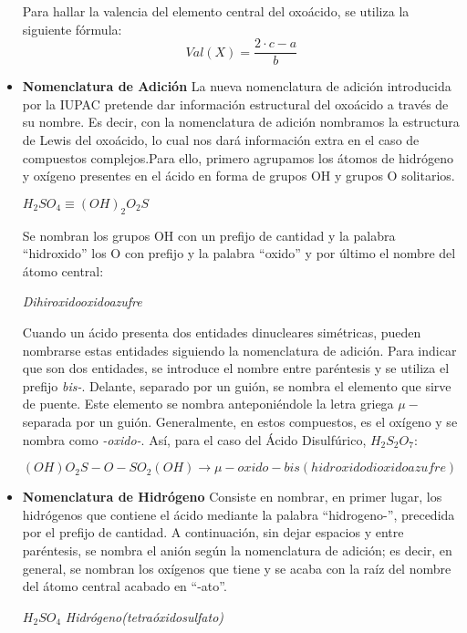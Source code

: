 \documentclass[11pt,fleqn]{book} %
\begin{document}
\begin{itemize}
\begin{table} [h!]
	\end{table}
	Para hallar la valencia del elemento central del oxoácido, se utiliza la siguiente fórmula:
	\begin{equation}
		Val(X)=\frac{2\cdot c-a}{b}
	\end{equation}
	\item \textbf{Nomenclatura de Adición} La nueva nomenclatura de adición introducida por la IUPAC pretende dar información estructural del oxoácido a través de su nombre. Es decir, con la nomenclatura de adición nombramos la estructura de Lewis del oxoácido, lo cual nos dará información extra en el caso de compuestos complejos.Para ello, primero agrupamos los átomos de hidrógeno y oxígeno presentes en el ácido en forma de grupos OH y grupos O solitarios.
	\begin{center}
		$H_{2}SO_{4}  \equiv (OH)_{2}O_{2}S$
	\end{center}
	Se nombran los grupos OH con un prefijo de cantidad y la palabra “hidroxido” los O con prefijo y la palabra “oxido” y por último el nombre del átomo central:
	\begin{center}
		\textit{Dihiroxidooxidoazufre}
	\end{center}
	Cuando un ácido presenta dos entidades dinucleares simétricas, pueden nombrarse estas entidades siguiendo la nomenclatura de adición. Para indicar que son dos entidades, se introduce el nombre entre paréntesis y se utiliza el prefijo \emph{bis-}. Delante, separado por un guión, se nombra el elemento que sirve de puente. Este elemento se nombra anteponiéndole la letra griega \emph{$\mu -$} separada por un guión. Generalmente, en estos compuestos, es el oxígeno y se nombra como \emph{-oxido-}. Así, para el caso del Ácido Disulfúrico, $H_{2}S_{2}O_{7}$:
	\begin{center}
		$(OH)O_{2}S-O-SO_{2}(OH) \rightarrow \mu -oxido-bis(hidroxidodioxidoazufre)$
	\end{center}
	\item\textbf{Nomenclatura de Hidrógeno} Consiste en nombrar, en primer lugar, los hidrógenos que contiene el ácido mediante la palabra “hidrogeno-”, precedida por el prefijo de cantidad. A continuación, sin dejar espacios y entre paréntesis, se nombra el anión según la nomenclatura de adición; es decir, en general, se nombran los oxígenos que tiene y se acaba con la raíz del nombre del átomo central acabado en “-ato”.
	\begin{center}
		$H_{2}SO_{4}$ \textit{Hidrógeno(tetraóxidosulfato)}
	\end{center}
	
\end{itemize}
\end{document}
